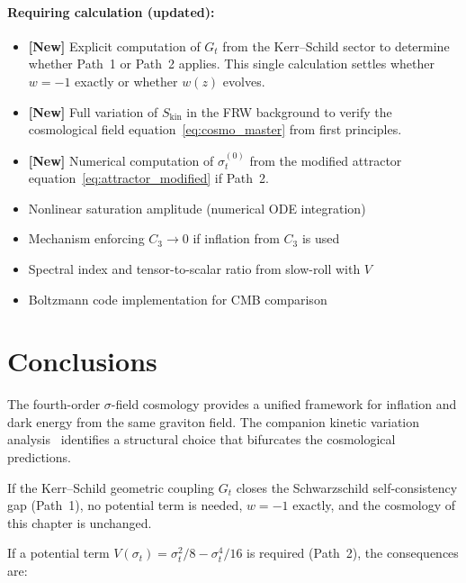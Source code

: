 \documentclass[11pt,a4paper]{article}
\theoremstyle{plain}
\theoremstyle{definition}
\theoremstyle{remark}
\begin{document}
\paragraph{Requiring calculation (updated):}
\begin{itemize}
  \item \textbf{[New]} Explicit computation of $G_t$ from the
    Kerr--Schild sector to determine whether Path~1 or Path~2 applies.
    This single calculation settles whether $w = -1$ exactly or
    whether $w(z)$ evolves.
  \item \textbf{[New]} Full variation of $S_{\mathrm{kin}}$ in the FRW
    background to verify the cosmological field equation~\eqref{eq:cosmo_master}
    from first principles.
  \item \textbf{[New]} Numerical computation of $\sigma_t^{(0)}$ from
    the modified attractor equation~\eqref{eq:attractor_modified} if
    Path~2.
  \item Nonlinear saturation amplitude (numerical ODE integration)
  \item Mechanism enforcing $C_3 \to 0$ if inflation from $C_3$ is used
  \item Spectral index and tensor-to-scalar ratio from slow-roll with $V$
  \item Boltzmann code implementation for CMB comparison
\end{itemize}

\section{Conclusions}
\label{sec:conclusions}

The fourth-order $\sigma$-field cosmology provides a unified framework
for inflation and dark energy from the same graviton field.  The
companion kinetic variation analysis~\cite{matshaba2026:kin_var}
identifies a structural choice that bifurcates the cosmological
predictions.

If the Kerr--Schild geometric coupling $G_t$ closes the Schwarzschild
self-consistency gap (Path~1), no potential term is needed, $w = -1$
exactly, and the cosmology of this chapter is unchanged.

If a potential term $V(\sigma_t) = \sigma_t^2/8 - \sigma_t^4/16$ is
required (Path~2), the consequences are:
\end{document}
